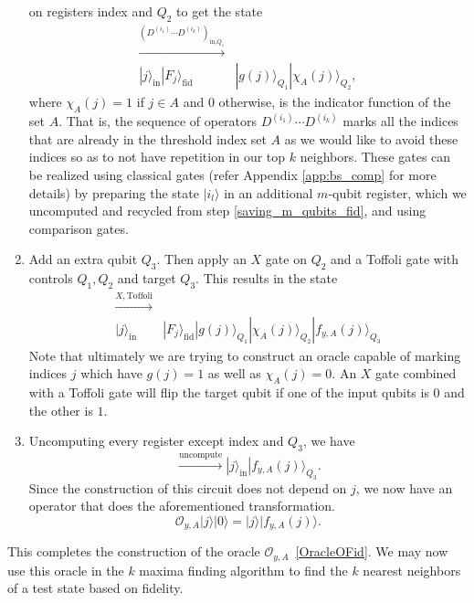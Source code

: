 \documentclass[a4paper,twocolumn,11pt,unpublished]{quantumarticle}
\newcommand{\rang}{\rangle}
\begin{document}
\begin{enumerate}
            on registers index and $Q_2$ to get the state
            \begin{equation}
            \begin{split}    
                \xrightarrow{\left(D^{(i_1)} \cdots D^{(i_k)}\right)_{\text{in,}Q_1}}&\\ |j\rang_\text{in} |F_j\rang_\text{fid} &|g(j)\rang_{Q_1} |\chi_A(j)\rang_{Q_2},
            \end{split}
            \end{equation}
            where $\chi_A(j) = 1$ if $j \in A$ and $0$ otherwise, is the indicator function of the set $A$. That is, the sequence of operators $D^{(i_1)}\cdots D^{(i_k)}$ marks all the indices that are already in the threshold index set $A$ as we would like to avoid these indices so as to not have repetition in our top $k$ neighbors. These gates can be realized using classical gates (refer Appendix \ref{app:bs_comp} for more details) by preparing the state $|i_l \rangle$ in an additional $m$-qubit register, which we uncomputed and recycled from step \ref{saving_m_qubits_fid}, and using comparison gates.
        \item 
            Add an extra qubit $Q_3$. Then apply an $X$ gate on $Q_2$ and a Toffoli gate with controls $Q_1, Q_2$ and target $Q_3$. This results in the state
            \begin{equation}
                \begin{split}
                    \xrightarrow{X, \text{Toffoli}}& \\|j\rang_\text{in} &|F_j\rang_\text{fid} |g(j)\rang_{Q_1} |\chi_A(j)\rang_{Q_2} |f_{y,A}(j)\rang_{Q_3}
                \end{split}
            \end{equation}
            Note that ultimately we are trying to construct an oracle capable of marking indices $j$ which have $g(j) = 1$ as well as $\chi_A(j) = 0$. An $X$ gate combined with a Toffoli gate will flip the target qubit if one of the input qubits is $0$ and the other is $1$. 
            \item
            Uncomputing every register except index and $Q_3$, we have
            \begin{equation}
                \xrightarrow {\text{uncompute}}|j\rang_{\text{in}}|f_{y, A}(j)\rang_{Q_3}.
            \end{equation}
            Since the construction of this circuit does not depend on $j$, we now have an operator that does the aforementioned transformation. 
            \begin{equation}
                \mathcal O_{y, A}|j\rang|0\rang = |j\rang|f_{y,A}(j)\rang.
            \end{equation}
    \end{enumerate}
    This completes the construction of the oracle $\mathcal O_{y,A}$~\eqref{OracleOFid}. We may now use this oracle in the $k$ maxima finding algorithm to find the $k$ nearest neighbors of a test state based on fidelity. 
    
\end{document}
